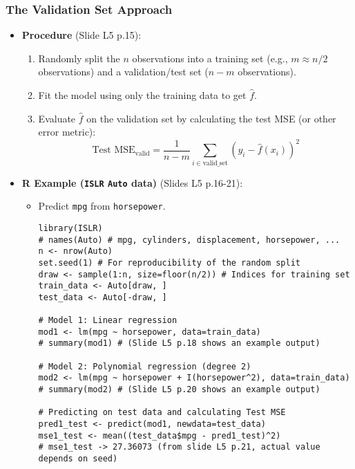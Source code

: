 \documentclass[12pt,a4paper]{article}
\newcommand{\Rpackage}[1]{\texttt{#1}} %
\newcommand{\Robject}[1]{\texttt{#1}} %
\begin{document}
\begin{itemize}
    \subsubsection{The Validation Set Approach}
        \begin{itemize}
            \item \textbf{Procedure} (Slide L5 p.15):
                \begin{enumerate}
                    \item Randomly split the $n$ observations into a training set (e.g., $m \approx n/2$ observations) and a validation/test set ($n-m$ observations).
                    \item Fit the model using only the training data to get $\hat{f}$.
                    \item Evaluate $\hat{f}$ on the validation set by calculating the test MSE (or other error metric):
                        $$ \text{Test MSE}_{\text{valid}} = \frac{1}{n-m} \sum_{i \in \text{valid\_set}} (y_i - \hat{f}(x_i))^2 $$
                \end{enumerate}
            \item \textbf{R Example (\Rpackage{ISLR} \Robject{Auto} data)} (Slides L5 p.16-21):
                \begin{itemize}
                    \item Predict \Robject{mpg} from \Robject{horsepower}.
\begin{lstlisting}[caption={Validation Set Approach in R (Slides L5 p.16, 18, 21)}]
library(ISLR)
# names(Auto) # mpg, cylinders, displacement, horsepower, ...
n <- nrow(Auto)
set.seed(1) # For reproducibility of the random split
draw <- sample(1:n, size=floor(n/2)) # Indices for training set
train_data <- Auto[draw, ]
test_data <- Auto[-draw, ]

# Model 1: Linear regression
mod1 <- lm(mpg ~ horsepower, data=train_data)
# summary(mod1) # (Slide L5 p.18 shows an example output)

# Model 2: Polynomial regression (degree 2)
mod2 <- lm(mpg ~ horsepower + I(horsepower^2), data=train_data)
# summary(mod2) # (Slide L5 p.20 shows an example output)

# Predicting on test data and calculating Test MSE
pred1_test <- predict(mod1, newdata=test_data)
mse1_test <- mean((test_data$mpg - pred1_test)^2)
# mse1_test -> 27.36073 (from slide L5 p.21, actual value depends on seed)


\end{lstlisting}
\end{itemize}
\end{itemize}
\end{itemize}
\end{document}
